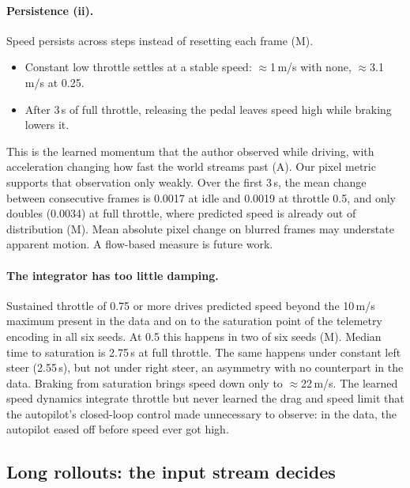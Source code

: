 \documentclass[11pt]{article}
\begin{document}
\paragraph{Persistence (ii).} Speed persists across steps instead of resetting each frame (M).
\begin{itemize}
  \item Constant low throttle settles at a stable speed: $\approx$1\,m/s with none, $\approx$3.1\,m/s at 0.25.
  \item After 3\,s of full throttle, releasing the pedal leaves speed high while braking lowers it.
\end{itemize}
This is the learned momentum that the author observed while driving, with acceleration changing how fast the world streams past (A). Our pixel metric supports that observation only weakly. Over the first 3\,s, the mean change between consecutive frames is 0.0017 at idle and 0.0019 at throttle 0.5, and only doubles (0.0034) at full throttle, where predicted speed is already out of distribution (M). Mean absolute pixel change on blurred frames may understate apparent motion. A flow-based measure is future work.

\paragraph{The integrator has too little damping.} Sustained throttle of 0.75 or more drives predicted speed beyond the 10\,m/s maximum present in the data and on to the saturation point of the telemetry encoding in all six seeds. At 0.5 this happens in two of six seeds (M). Median time to saturation is 2.75\,s at full throttle. The same happens under constant left steer (2.55\,s), but not under right steer, an asymmetry with no counterpart in the data. Braking from saturation brings speed down only to $\approx$22\,m/s. The learned speed dynamics integrate throttle but never learned the drag and speed limit that the autopilot's closed-loop control made unnecessary to observe: in the data, the autopilot eased off before speed ever got high.

\subsection{Long rollouts: the input stream decides}
\label{sec:long}
\end{document}
